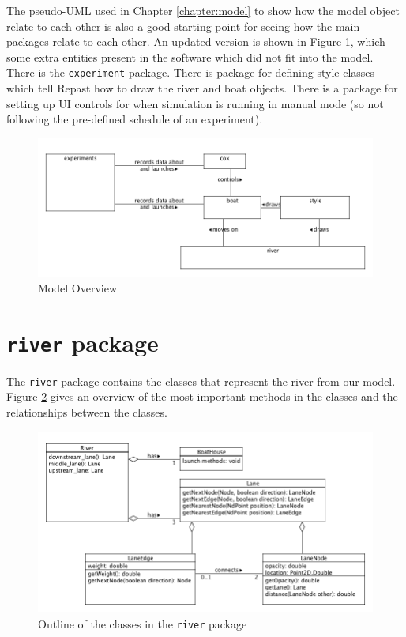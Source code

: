 The pseudo-UML used in Chapter \ref{chapter:model} to show how the model object relate to each other is also a
good starting point for seeing how the main packages relate to each
other. An updated version is shown in Figure \ref{software:fig:modeloverview}, which some extra entities present in the software which did not fit into the model. There
is the \texttt{experiment} package. There is package for defining style
classes which tell Repast how to draw the river and boat
objects. There is a package for setting up UI controls for when
simulation is running in manual mode (so not following the
pre-defined schedule of an experiment).

\begin{figure}
\begin{center}
  \includegraphics[scale=0.3]{images/packages.png}
  \caption{Model Overview}
  \label{software:fig:modeloverview}
\end{center}
\end{figure}



\section{\texttt{river} package}
The \texttt{river} package contains the classes that represent the river from our model. Figure \ref{software:fig:riverUML} gives an overview of the most important methods in the classes and the relationships between the classes.

\begin{figure}
\begin{center}
  \includegraphics[scale=0.3]{images/riverpackage.png}
  \caption{Outline of the classes in the \texttt{river} package}
  \label{software:fig:riverUML}
\end{center}
\end{figure}

